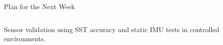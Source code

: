 \begin{frame}{Plan for the Next Week}
    \begin{columns}[T]
        \begin{column}{0.5\textwidth}
            \centering
        \end{column}
        \begin{column}{0.5\textwidth}
            \centering
        \end{column}
    \end{columns}
    \vspace{1em}
    \begin{center}
        \small Sensor validation using SST accuracy and static IMU tests in controlled environments.
    \end{center}
\end{frame}
